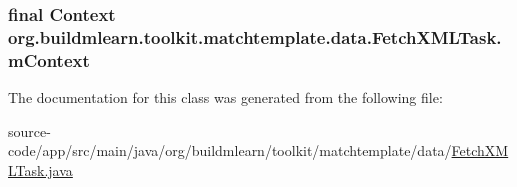 \subsubsection[{\texorpdfstring{m\+Context}{mContext}}]{\setlength{\rightskip}{0pt plus 5cm}final Context org.\+buildmlearn.\+toolkit.\+matchtemplate.\+data.\+Fetch\+X\+M\+L\+Task.\+m\+Context\hspace{0.3cm}{\ttfamily [private]}}\hypertarget{classorg_1_1buildmlearn_1_1toolkit_1_1matchtemplate_1_1data_1_1FetchXMLTask_acb47eca79ec1252afc37942a17a7e7f6}{}\label{classorg_1_1buildmlearn_1_1toolkit_1_1matchtemplate_1_1data_1_1FetchXMLTask_acb47eca79ec1252afc37942a17a7e7f6}


The documentation for this class was generated from the following file\+:\begin{DoxyCompactItemize}
\item 
source-\/code/app/src/main/java/org/buildmlearn/toolkit/matchtemplate/data/\hyperlink{matchtemplate_2data_2FetchXMLTask_8java}{Fetch\+X\+M\+L\+Task.\+java}\end{DoxyCompactItemize}
